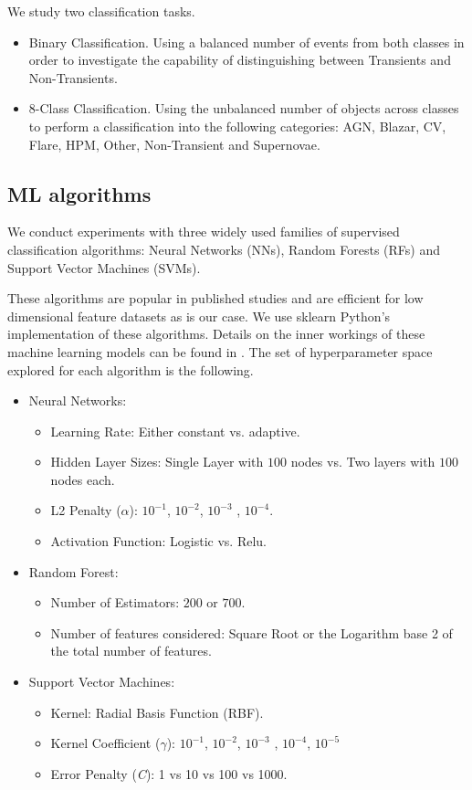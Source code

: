 \documentclass[a4paper,fleqn,usenatbib]{mnras}
\begin{document}
We study two classification tasks.

\begin{itemize}
\item {Binary Classification}.
Using a balanced number of events from both classes in order 
to investigate the capability of distinguishing between Transients
and Non-Transients.
\item{8-Class Classification}.
Using the unbalanced number of objects across classes to 
perform a classification into the following categories:
AGN, Blazar, CV, Flare, HPM, Other, Non-Transient and Supernovae.  
\end{itemize}

\subsection{ML algorithms}


We conduct experiments with three widely used families of supervised classification 
algorithms: Neural Networks (NNs), Random Forests (RFs) and Support
Vector Machines (SVMs). 

These algorithms are popular in published studies and are efficient 
for low dimensional feature datasets as is our case. 
We use sklearn \citep{1201.0490} Python's implementation of these algorithms.
Details on the inner workings of these machine learning models can be
found in \cite{9780387848570}.  
The set of hyperparameter space explored for each algorithm is the
following. 

\begin{itemize}
\item Neural Networks:
\begin{itemize}
\item Learning Rate: Either constant vs. adaptive.
\item Hidden Layer Sizes: Single Layer with $100$ nodes vs. Two layers with
  $100$ nodes each.
\item L2 Penalty ($\alpha$): 
  $10^{-1}$, $10^{-2}$, $10^{-3}$ , $10^{-4}$.
\item Activation Function: Logistic vs. Relu.
\end{itemize}

\item Random Forest:
\begin{itemize}
    \item Number of Estimators: $200$ or $700$.
    \item Number of features considered: Square Root or the Logarithm 
    base 2 of the total number of features.
\end{itemize}

\item Support Vector Machines:
\begin{itemize}
    \item Kernel: Radial Basis Function (RBF).
    \item Kernel Coefficient ($\gamma$):  
      $10^{-1}$, $10^{-2}$, $10^{-3}$ , $10^{-4}$, $10^{-5}$
    \item Error Penalty (\textit{C}): 1 vs 10 vs 100 vs 1000. 
\end{itemize}
\end{itemize}
\end{document}
